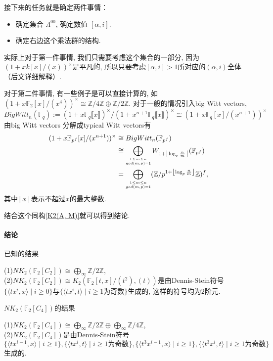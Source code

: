 接下来的任务就是确定两件事情：
\begin{itemize}
	\item 确定集合{\color{blue} $\Lambda^{00}$}, 确定数值{\color{blue} $[\alpha, i]$}. 
	\item 确定右边这个{\color{blue}乘法群}的结构. 
\end{itemize}
实际上对于第一件事情, 我们只需要考虑这个集合的一部分, 因为$(1+xk[x]/(x))^{\times}$是平凡的, 所以只要考虑$[\alpha, i]>1$所对应的$(\alpha, i)$全体（后文详细解释）. 

对于第二件事情, 有一些例子是可以直接计算的, 如$(1+x\mathbb{F}_2[x]/(x^{4}))^{\times}\cong \mathbb{Z}/4 \mathbb{Z} \oplus\mathbb{Z}/2 \mathbb{Z}$. 对于一般的情况引入big Witt vectors, 
\[BigWitt_n(\mathbb{F}_q):=(1+x \mathbb{F}_q\llbracket x\rrbracket )^{\times}/(1+x^{n+1} \mathbb{F}_q\llbracket x\rrbracket )^{\times} \cong (1+x\mathbb{F}_q[x]/(x^{n+1}))^{\times}\]
由big Witt vectors{\color{blue} 分解成typical Witt vectors}有
\begin{align*}
(1+x\mathbb{F}_{p^f}[x]/(x^{n+1}))^{\times}&\cong BigWitt_n(\mathbb{F}_{p^f}) \\
&\cong \bigoplus_{\scriptsize\substack{1\leq m\leq n \\ gcd(m, p)=1}}W_{1+ \left \lfloor\log_p \frac{n}{m}  \right \rfloor}(\mathbb{F}_{p^f}) \\
& = \bigoplus_{\scriptsize\substack{1\leq m\leq n \\ gcd(m, p)=1}}(\mathbb{Z}/p^{1+ \left \lfloor\log_p \frac{n}{m}  \right \rfloor}\mathbb{Z})^f, 
\end{align*}
其中$ \left \lfloor x \right \rfloor$表示不超过$x$的最大整数. 

结合这个同构\ref{K2(A, M)}就可以得到结论. 

\paragraph{结论} %
\label{par:结论}
已知的结果{\color{gray}
\begin{theorem*}
	(1)$NK_2(\mathbb{F}_2[C_2])\cong \bigoplus_{\infty} \mathbb{Z}/2 \mathbb{Z}$, \\
	(2)$NK_2(\mathbb{F}_2[C_2])\cong K_2(\mathbb{F}_2[t, x]/(t^2), (t))$是由Dennis-Stein符号$\{\langle tx^i, x \rangle \mid i\geq 0\}$与$\{\langle tx^i, t \rangle \mid i\geq 1\text{为奇数}\}$生成的, 这样的符号均为$2$阶元. 
\end{theorem*}
}
$NK_2(\mathbb{F}_2[C_4])$的结果
{\color{red}\begin{theorem*}
	(1)$NK_2(\mathbb{F}_2[C_4])\cong \bigoplus_{\infty} \mathbb{Z}/2 \mathbb{Z}\oplus \bigoplus_{\infty}\mathbb{Z}/4 \mathbb{Z}$, \\
	(2)$NK_2(\mathbb{F}_2[C_4])$是由Dennis-Stein符号
	\[\{\langle tx^{i-1}, x \rangle \mid i\geq 1\}, \{\langle tx^i, t \rangle \mid i\geq 1\text{为奇数}\}, \{\langle t^3x^{i-1}, x \rangle \mid i\geq 1\}, %
	\{\langle t^3x^i, t \rangle \mid i\geq 1\text{为奇数}\}\]
	生成的. 
\end{theorem*}}

